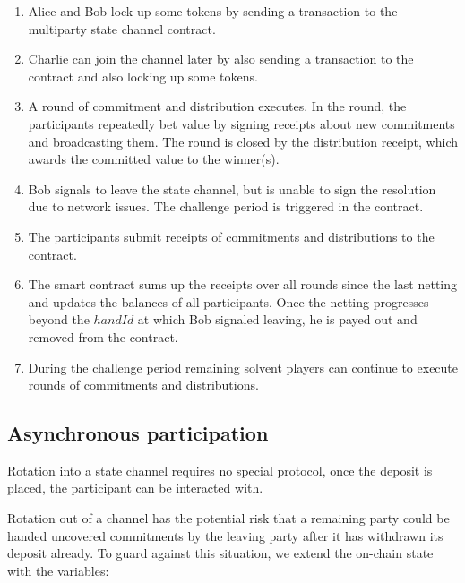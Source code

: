 \begin{enumerate}
\item Alice and Bob lock up some tokens by sending a transaction to the multiparty state channel contract.
\item Charlie can join the channel later by also sending a transaction to the contract and also locking up some tokens.
\item A round of commitment and distribution executes. In the round, the participants repeatedly bet value by signing receipts about new commitments and broadcasting them. The round is  closed by the distribution receipt, which awards the committed value to the winner(s).
\item Bob signals to leave the state channel, but is unable to sign the resolution due to network issues. The challenge period is triggered in the contract.
\item The participants submit receipts of commitments and distributions to the contract.
\item The smart contract sums up the receipts over all rounds since the last netting and updates the balances of all participants. Once the netting progresses beyond the \(handId\) at which Bob signaled leaving, he is payed out and removed from the contract.
\item During the challenge period remaining solvent players can continue to execute rounds of commitments and distributions.
\end{enumerate}

\subsection{Asynchronous participation}

Rotation into a state channel requires no special protocol, once the deposit is placed, the participant can be interacted with.

Rotation out of a channel has the potential risk that a remaining party could be handed uncovered commitments by the leaving party after it has withdrawn its deposit already. To guard against this situation, we extend the on-chain state with the variables:


